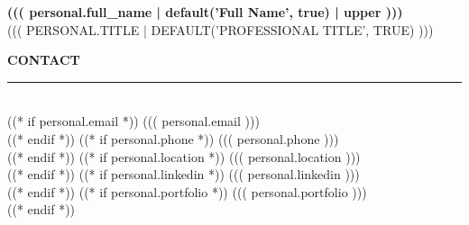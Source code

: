 \documentclass[11pt,a4paper]{article}
\begin{document}
\noindent
{}

\noindent
\begin{minipage}[t]{0.34\textwidth}
\color{white}
\vspace{10mm}
\hspace{7mm}
\begin{minipage}[t]{0.80\textwidth}

\begin{center}
{\fontsize{20}{24}\selectfont\bfseries ((( personal.full_name | default('Full Name', true) | upper )))}\\[6pt]
{\fontsize{8}{10}\selectfont\color{gold}\MakeUppercase{((( personal.title | default('Professional Title', true) )))}}
\end{center}

\vspace{7mm}

{\fontsize{9}{11}\selectfont\color{gold}\bfseries\MakeUppercase{Contact}}\\[2pt]
{\color{gold!40}\rule{\linewidth}{0.3pt}}\\[8pt]
((* if personal.email *))
{\small\faEnvelope\hspace{8pt}((( personal.email )))}\\[8pt]
((* endif *))
((* if personal.phone *))
{\small\faPhone\hspace{8pt}((( personal.phone )))}\\[8pt]
((* endif *))
((* if personal.location *))
{\small\faMapMarker*\hspace{8pt}((( personal.location )))}\\[8pt]
((* endif *))
((* if personal.linkedin *))
{\small\faLinkedin\hspace{8pt}((( personal.linkedin )))}\\
((* endif *))
((* if personal.portfolio *))
{\small\faGlobe\hspace{8pt}((( personal.portfolio )))}\\
((* endif *))

\vspace{9pt}


\end{minipage}
\end{minipage}
\end{document}
